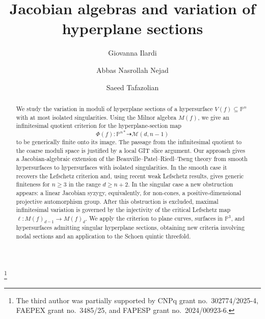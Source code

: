 \documentclass[11pt]{amsart}
\theoremstyle{plain}
\theoremstyle{definition}
\numberwithin{equation}{section}
\newcommand{\M}{{\mathcal M}}
\newcommand{\PP}{\mathbb{P}}
\begin{document}

\title[Jacobian algebras and variation of hyperplane sections] {Jacobian algebras and variation of hyperplane sections}

	\author{Giovanna Ilardi}
		\address{Dipartimento Matematica e Applicazioni ``R. Caccioppoli'', Università degli Studi	Di Napoli “Federico II” Via Cintia - Complesso Universitario Di Monte S. Angelo 80126 - Napoli - Italia}
		\author{Abbas Nasrollah Nejad}
		\address{Department of Mathematics, Institute for Advanced Studies in Basic Sciences (IASBS), Zanjan 45137-66731, Iran}
		\author{Saeed Tafazolian}
		\address{Universidade Estadual de Campinas (UNICAMP) \\ Instituto de Matem\'atica, Estat\'{\i}stica e Computação Cient\'{\i}fica (IMECC) \\ Departamento de Matem\'atica \\
			Rua S\'ergio Buarque de Holanda, 651\\ 13083-970 Campinas-SP, Brazil}
\thanks{The third author was partially supported by CNPq grant no.~302774/2025-4, FAEPEX grant no.~3485/25, and FAPESP grant no.~2024/00923-6.}












\begin{abstract}
We study the variation in moduli of hyperplane sections of a hypersurface $V(f)\subseteq\PP^n$ with at most isolated singularities. Using the Milnor
algebra $M(f)$, we give an infinitesimal quotient criterion for the hyperplane-section map
\[
\Phi(f):\PP^{n*}\dashrightarrow \M(d,n-1)
\]
to be generically finite onto its image. The passage from the infinitesimal quotient to the coarse moduli space is justified by a local GIT slice argument.
Our approach gives a Jacobian-algebraic extension of the Beauville--Patel--Riedl--Tseng theory from smooth hypersurfaces to hypersurfaces with isolated singularities. In the smooth case it recovers the Lefschetz criterion and, using recent weak Lefschetz results, gives generic finiteness for $n\geq3$ in the range $d\geq n+2$. In the singular case a new obstruction appears: a linear Jacobian syzygy, equivalently, for non-cones, a positive-dimensional projective automorphism group. After this obstruction is excluded, maximal infinitesimal variation is governed by the injectivity of the critical Lefschetz map $\ell:M(f)_{d-1}\to M(f)_d$. We apply the criterion to plane curves, surfaces in $\PP^3$, and hypersurfaces admitting singular hyperplane sections, obtaining new criteria involving nodal sections and an
application to the Schoen quintic threefold.

\end{abstract}
\end{document}
